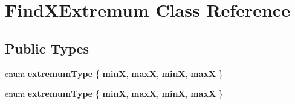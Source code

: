 \hypertarget{classFindXExtremum}{}\section{Find\+X\+Extremum Class Reference}
\label{classFindXExtremum}
\subsection*{Public Types}
\begin{DoxyCompactItemize}
\item 
\hypertarget{classFindXExtremum_a51c0ae56780d5d63dedd4a6371c10d20}{}enum {\bfseries extremum\+Type} \{ {\bfseries min\+X}, 
{\bfseries max\+X}, 
{\bfseries min\+X}, 
{\bfseries max\+X}
 \}\label{classFindXExtremum_a51c0ae56780d5d63dedd4a6371c10d20}

\item 
\hypertarget{classFindXExtremum_a51c0ae56780d5d63dedd4a6371c10d20}{}enum {\bfseries extremum\+Type} \{ {\bfseries min\+X}, 
{\bfseries max\+X}, 
{\bfseries min\+X}, 
{\bfseries max\+X}
 \}\label{classFindXExtremum_a51c0ae56780d5d63dedd4a6371c10d20}

\end{DoxyCompactItemize}
